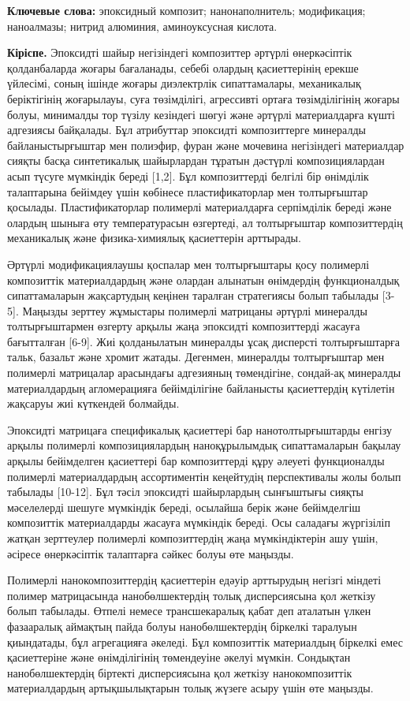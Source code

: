 {\bfseries Ключевые слова:} эпоксидный композит; нанонаполнитель;
модификация; наноалмазы; нитрид алюминия, аминоуксусная кислота.

{\bfseries Кіріспе.} Эпоксидті шайыр негізіндегі композиттер әртүрлі
өнеркәсіптік қолданбаларда жоғары бағаланады, себебі олардың
қасиеттерінің ерекше үйлесімі, соның ішінде жоғары диэлектрлік
сипаттамалары, механикалық беріктігінің жоғарылауы, суға төзімділігі,
агрессивті ортаға төзімділігінің жоғары болуы, минималды тор түзілу
кезіндегі шөгуі және әртүрлі материалдарға күшті адгезиясы байқалады.
Бұл атрибуттар эпоксидті композиттерге минералды байланыстырғыштар мен
полиэфир, фуран және мочевина негізіндегі материалдар сияқты басқа
синтетикалық шайырлардан тұратын дәстүрлі композициялардан асып түсуге
мүмкіндік береді {[}1,2{]}. Бұл композиттерді белгілі бір өнімділік
талаптарына бейімдеу үшін көбінесе пластификаторлар мен толтырғыштар
қосылады. Пластификаторлар полимерлі материалдарға серпімділік береді
және олардың шыныға өту температурасын өзгертеді, ал толтырғыштар
композиттердің механикалық және физика-химиялық қасиеттерін арттырады.

Әртүрлі модификациялаушы қоспалар мен толтырғыштары қосу полимерлі
композиттік материалдардың және олардан алынатын өнімдердің
функционалдық сипаттамаларын жақсартудың кеңінен таралған стратегиясы
болып табылады {[}3-5{]}. Маңызды зерттеу жұмыстары полимерлі матрицаны
әртүрлі минералды толтырғыштармен өзгерту арқылы жаңа эпоксидті
композиттерді жасауға бағытталған {[}6-9{]}. Жиі қолданылатын минералды
ұсақ дисперсті толтырғыштарға тальк, базальт және хромит жатады.
Дегенмен, минералды толтырғыштар мен полимерлі матрицалар арасындағы
адгезияның төмендігіне, сондай-ақ минералды материалдардың агломерацияға
бейімділігіне байланысты қасиеттердің күтілетін жақсаруы жиі күткендей
болмайды.

Эпоксидті матрицаға спецификалық қасиеттері бар нанотолтырғыштарды
енгізу арқылы полимерлі композициялардың наноқұрылымдық сипаттамаларын
бақылау арқылы бейімделген қасиеттері бар композиттерді құру әлеуеті
функционалды полимерлі материалдардың ассортиментін кеңейтудің
перспективалы жолы болып табылады {[}10-12{]}. Бұл тәсіл эпоксидті
шайырлардың сынғыштығы сияқты мәселелерді шешуге мүмкіндік береді,
осылайша берік және бейімделгіш композиттік материалдарды жасауға
мүмкіндік береді. Осы саладағы жүргізіліп жатқан зерттеулер полимерлі
композиттердің жаңа мүмкіндіктерін ашу үшін, әсіресе өнеркәсіптік
талаптарға сәйкес болуы өте маңызды.

Полимерлі нанокомпозиттердің қасиеттерін едәуір арттырудың негізгі
міндеті полимер матрицасында нанобөлшектердің толық дисперсиясына қол
жеткізу болып табылады. Өтпелі немесе трансшекаралық қабат деп аталатын
үлкен фазааралық аймақтың пайда болуы нанобөлшектердің біркелкі таралуын
қиындатады, бұл агрегацияға әкеледі. Бұл композиттік материалдың
біркелкі емес қасиеттеріне және өнімділігінің төмендеуіне әкелуі мүмкін.
Сондықтан нанобөлшектердің біртекті дисперсиясына қол жеткізу
нанокомпозиттік материалдардың артықшылықтарын толық жүзеге асыру үшін
өте маңызды.

